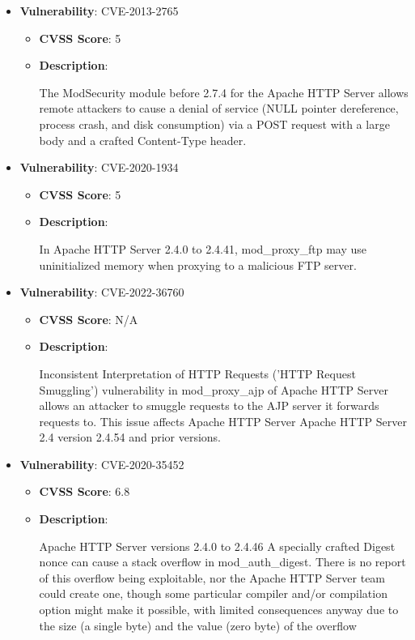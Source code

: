\documentclass{article}
\begin{document}
\begin{itemize}
    
        \item \textbf{Vulnerability}: CVE-2013-2765
        \begin{itemize}
            \item \textbf{CVSS Score}:  5 
            \item \textbf{Description}:
            \parbox[t]{0.9\linewidth}{
                \ttfamily The ModSecurity module before 2.7.4 for the Apache HTTP Server allows remote attackers to cause a denial of service (NULL pointer dereference, process crash, and disk consumption) via a POST request with a large body and a crafted Content-Type header.
            }
        \end{itemize}
    
        \item \textbf{Vulnerability}: CVE-2020-1934
        \begin{itemize}
            \item \textbf{CVSS Score}:  5 
            \item \textbf{Description}:
            \parbox[t]{0.9\linewidth}{
                \ttfamily In Apache HTTP Server 2.4.0 to 2.4.41, mod\_proxy\_ftp may use uninitialized memory when proxying to a malicious FTP server.
            }
        \end{itemize}
    
        \item \textbf{Vulnerability}: CVE-2022-36760
        \begin{itemize}
            \item \textbf{CVSS Score}:  N/A 
            \item \textbf{Description}:
            \parbox[t]{0.9\linewidth}{
                \ttfamily Inconsistent Interpretation of HTTP Requests ('HTTP Request Smuggling') vulnerability in mod\_proxy\_ajp of Apache HTTP Server allows an attacker to smuggle requests to the AJP server it forwards requests to.  This issue affects Apache HTTP Server Apache HTTP Server 2.4 version 2.4.54 and prior versions.
            }
        \end{itemize}
    
        \item \textbf{Vulnerability}: CVE-2020-35452
        \begin{itemize}
            \item \textbf{CVSS Score}:  6.8 
            \item \textbf{Description}:
            \parbox[t]{0.9\linewidth}{
                \ttfamily Apache HTTP Server versions 2.4.0 to 2.4.46 A specially crafted Digest nonce can cause a stack overflow in mod\_auth\_digest. There is no report of this overflow being exploitable, nor the Apache HTTP Server team could create one, though some particular compiler and/or compilation option might make it possible, with limited consequences anyway due to the size (a single byte) and the value (zero byte) of the overflow
            }
        \end{itemize}
    

\end{itemize}
\end{document}
